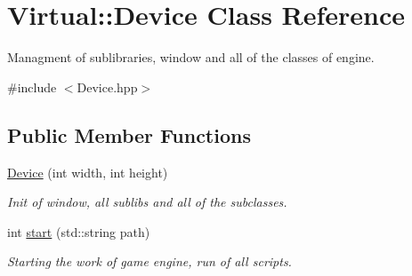 \hypertarget{class_virtual_1_1_device}{}\section{Virtual\+:\+:Device Class Reference}
\label{class_virtual_1_1_device}


Managment of sublibraries, window and all of the classes of engine.  




{\ttfamily \#include $<$Device.\+hpp$>$}

\subsection*{Public Member Functions}
\begin{DoxyCompactItemize}
\item 
\hyperlink{class_virtual_1_1_device_a01750717800affee98304503b6e7394d}{Device} (int width, int height)
\begin{DoxyCompactList}\small\item\em Init of window, all sublibs and all of the subclasses. \end{DoxyCompactList}\item 
int \hyperlink{class_virtual_1_1_device_aaadbfd2dd970af7a42a858ee52d36869}{start} (std\+::string path)
\begin{DoxyCompactList}\small\item\em Starting the work of game engine, run of all scripts. \end{DoxyCompactList}\end{DoxyCompactItemize}
